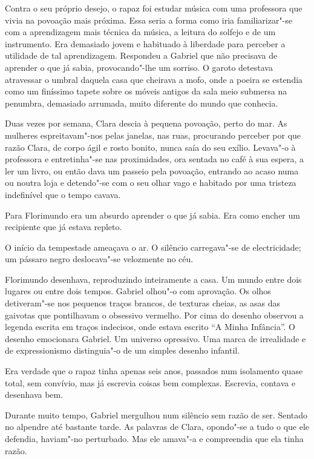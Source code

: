 Contra o seu próprio desejo, o rapaz foi estudar música com uma
professora que vivia na povoação mais próxima. Essa seria a forma como
iria familiarizar"-se com a aprendizagem mais técnica da música, a
leitura do solfejo e de um instrumento. Era demasiado jovem e habituado
à liberdade para perceber a utilidade de tal aprendizagem. Respondeu a
Gabriel que não precisava de aprender o que já sabia, provocando"-lhe um
sorriso. O garoto detestava atravessar o umbral daquela casa que
cheirava a mofo, onde a poeira se estendia como um finíssimo tapete
sobre os móveis antigos da sala meio submersa na penumbra, demasiado
arrumada, muito diferente do mundo que conhecia.

Duas vezes por semana, Clara descia à pequena povoação, perto do mar. As
mulheres espreitavam"-nos pelas janelas, nas ruas, procurando perceber
por que razão Clara, de corpo ágil e rosto bonito, nunca saía do seu
exílio. Levava"-o à professora e entretinha"-se nas proximidades, ora
sentada no café à sua espera, a ler um livro, ou então dava um passeio
pela povoação, entrando ao acaso numa ou noutra loja e detendo"-se com o
seu olhar vago e habitado por uma tristeza indefinível que o tempo
cavava.

Para Florimundo era um absurdo aprender o que já sabia. Era como encher
um recipiente que já estava repleto.

O início da tempestade ameaçava o ar. O silêncio carregava"-se de
electricidade; um pássaro negro deslocava"-se velozmente no céu.

Florimundo desenhava, reproduzindo inteiramente a casa. Um mundo entre
dois lugares ou entre dois tempos. Gabriel olhou"-o com aprovação. Os
olhos detiveram"-se nos pequenos traços brancos, de texturas cheias, as
asas das gaivotas que pontilhavam o obsessivo vermelho. Por cima do
desenho observou a legenda escrita em traços indecisos, onde estava
escrito ``A Minha Infância''. O desenho emocionara Gabriel. Um universo
opressivo. Uma marca de irrealidade e de expressionismo distinguia"-o de
um simples desenho infantil.

Era verdade que o rapaz tinha apenas seis anos, passados num isolamento
quase total, sem convívio, mas já escrevia coisas bem complexas.
Escrevia, contava e desenhava bem.

Durante muito tempo, Gabriel mergulhou num silêncio sem razão de ser.
Sentado no alpendre até bastante tarde. As palavras de Clara, opondo"-se
a tudo o que ele defendia, haviam"-no perturbado. Mas ele amava"-a e
compreendia que ela tinha razão.

